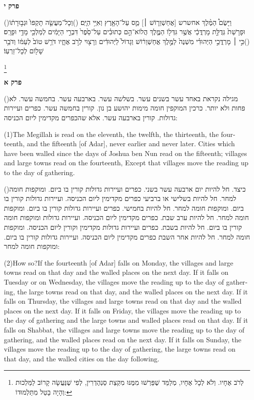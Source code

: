 \documentclass[12pt, openany]{book}
\newcommand{\partname}[1]{}
\newcommand{\sethebfont}{
\fontsize{10.5pt}{13.1pt} \selectfont
}
\newcommand{\hebeng}[2]{
	{\sethebfont #1\\}
	
	\begin{english}
		#2
	\end{english}
	\clearpage
}
\newcommand{\twocol}[1]{
	{\sethebfont \begin{multicols}{2}
			#1
	\end{multicols}}	
}
\newcommand{\chapname}{}
\newcommand{\newchap}[1]{
	\addcontentsline{toc}{chapter}{#1}
	\renewcommand{\chapname}{#1}
		\begin{center}
			\textbf{%
\fontsize{16pt}{16pt}\selectfont
				#1}
		\end{center}
}
\newcommand{\footnotecomment}[1]{
	\renewcommand\thefootnote{}
	\footnote{#1}}
\newcommand{\commenta}[1]{\footnotecomment{#1}\hspace{0em}}
\newcommand{\vsnum}[1]{(\hebrewnumeral{#1})\space}
\newcommand{\vsnumeng}[1]{(#1)\space}
\begin{document}
\newchap{פרק י}
\twocol{\vsnum{1}וַיָּשֶׂם֩ הַמֶּ֨לֶךְ אחשרש [אֲחַשְׁוֵר֧וֹשׁ ׀] מַ֛ס עַל־הָאָ֖רֶץ וְאִיֵּ֥י הַיָּֽם׃
\vsnum{2}וְכָל־מַעֲשֵׂ֤ה תָקְפּוֹ֙ וּגְב֣וּרָת֔וֹ וּפָרָשַׁת֙ גְּדֻלַּ֣ת מָרְדֳּכַ֔י אֲשֶׁ֥ר גִּדְּל֖וֹ הַמֶּ֑לֶךְ הֲלוֹא־הֵ֣ם כְּתוּבִ֗ים עַל־סֵ֙פֶר֙ דִּבְרֵ֣י הַיָּמִ֔ים לְמַלְכֵ֖י מָדַ֥י וּפָרָֽס׃
\vsnum{3}כִּ֣י ׀ מָרְדֳּכַ֣י הַיְּהוּדִ֗י מִשְׁנֶה֙ לַמֶּ֣לֶךְ אֲחַשְׁוֵר֔וֹשׁ וְגָדוֹל֙ לַיְּהוּדִ֔ים וְרָצ֖וּי לְרֹ֣ב אֶחָ֑יו דֹּרֵ֥שׁ טוֹב֙ לְעַמּ֔וֹ וְדֹבֵ֥ר שָׁל֖וֹם לְכָל־זַרְעֽוֹ׃%
\commenta{לְרֹב אֶחָיו. וְלֹא לְכָל אֶחָיו, מְלַמֵּד שֶׁפֵּרְשׁוּ מִמֶּנּוּ מִקְצַת סַנְהֶדְרִין, לְפִי שֶׁנַּעֲשָׂה קָרוֹב לַמַּלְכוּת וְהָיָה בָטֵל מִתַּלְמוּדוֹ: }%
}
\renewcommand{\partname}[1]{משנה מגילה}
\clearpage
\newchap{פרק א}
\hebeng{\vsnum{1}מגילה נקראת באחד עשר בשנים עשר. בשלשה עשר. בארבעה עשר. בחמשה עשר. לא פחות ולא יותר. כרכין המוקפין חומה מימות יהושע בן נון. קורין בחמשה עשר. כפרים ועיירות גדולות. קורין בארבעה עשר. אלא שהכפרים מקדימין ליום הכניסה: 
}{\vsnumeng{1}The Megillah is read on the eleventh, the twelfth, the thirteenth, the fourteenth, and the fifteenth {[of Adar]}, never earlier and never later. Cities which have been walled since the days of Joshua ben Nun read on the fifteenth; villages and large towns read on the fourteenth, Except that villages move the reading up to the day of gathering.}%

\hebeng{\vsnum{2}כיצד. חל להיות יום ארבעה עשר בשני. כפרים ועיירות גדולות קורין בו ביום. ומוקפות חומה למחר. חל להיות בשלישי או ברביעי כפרים מקדימין ליום הכניסה. ועיירות גדולות קורין בו ביום. ומוקפות חומה למחר. חל להיות בחמישי. כפרים ועיירות גדולות קורין בו ביום. ומוקפות חומה למחר. חל להיות ערב שבת. כפרים מקדימין ליום הכניסה. ועיירות גדולות ומוקפות חומה קורין בו ביום. חל להיות בשבת. כפרים ועיירות גדולות מקדימין וקורין ליום הכניסה. ומוקפות חומה למחר. חל להיות אחר השבת כפרים מקדימין ליום הכניסה. ועיירות גדולות קורין בו ביום. ומוקפות חומה למחר: 
}{\vsnumeng{2}How so?If the fourteenth {[of Adar]} falls on Monday, the villages and large towns read on that day and the walled places on the next day. If it falls on Tuesday or on Wednesday, the villages move the reading up to the day of gathering, the large towns read on that day, and the walled places on the next day. If it falls on Thursday, the villages and large towns read on that day and the walled places on the next day. If it falls on Friday, the villages move the reading up to the day of gathering and the large towns and walled places read on that day. If it falls on Shabbat, the villages and large towns move the reading up to the day of gathering, and the walled places read on the next day. If it falls on Sunday, the villages move the reading up to the day of gathering, the large towns read on that day, and the walled cities on the day following.}%
\end{document}
